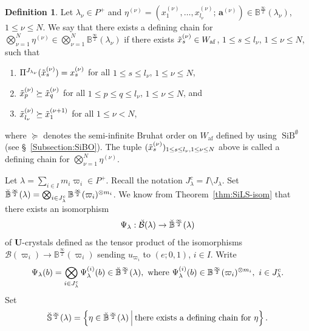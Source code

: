 \documentclass[10pt]{amsart}
\theoremstyle{definition}\newtheorem{defi}[theo]{Definition}
\theoremstyle{remark}\newtheorem{rema}[theo]{Remark}
\newcommand\bm[1]{\boldsymbol{#1}}
\newcommand{\U}{\mathbf{U}}
\newcommand{\si}{\frac{\infty}{2}}
\DeclareMathOperator{\af}{af}
\DeclareMathOperator{\SiB}{SiB}
\begin{document}
\begin{defi}
Let 
$\lambda_{\nu} \in P^+$
and 
$\eta^{(\nu)} = \left( x^{(\nu)}_1 , \ldots , x^{(\nu)}_{l_{\nu}} ;\, 
\bm{a}^{(\nu)} \right) \in \mathbb{B}^{\si}(\lambda_{\nu})$, 
$1 \leq \nu \leq N$. 
We say that there exists a defining chain for
$\bigotimes_{\nu = 1}^N \eta^{(\nu)} \in \bigotimes_{\nu = 1}^N \mathbb{B}^{\si}(\lambda_{\nu})$ 
if there exists 
$\Tilde{x}^{(\nu)}_s \in W_{\af}$, 
$1 \leq s \leq l_{\nu}$, $1 \leq \nu \leq N$, 
such that 
\begin{enumerate}[label=(DC\arabic*)]
\item
$\Pi^{J_{\lambda_{\nu}}}(\Tilde{x}^{(\nu)}_s) = x^{(\nu)}_s$ 
for all $1 \leq s \leq l_{\nu}$, $1 \leq \nu \leq N$, 
\item
$\Tilde{x}^{(\nu)}_p \succeq \Tilde{x}^{(\nu)}_q$ 
for all
$1 \leq p \leq q \leq l_{\nu}$, 
$1 \leq \nu \leq N$, 
and 
\item
$\Tilde{x}^{(\nu)}_{l_{\nu}} \succeq \Tilde{x}^{(\nu + 1)}_1$ 
for all $1 \leq \nu < N$, 
\end{enumerate}
where $\succeq$ 
denotes the semi-infinite Bruhat order 
on $W_{\af}$ defined by using 
$\SiB ^{\emptyset}$
(see \S~\ref{Subsection:SiBO}). 
The tuple
$( \Tilde{x}^{(\nu)}_s )_{1 \leq s \leq l_{\nu}, 1 \leq \nu \leq N}$
above is called a defining chain for 
$\bigotimes_{\nu = 1}^N \eta^{(\nu)}$.
\end{defi}

Let 
$\lambda = \sum_{i \in I} m_i \varpi_i \in P^+$. 
Recall the notation
$J_{\lambda}^c = I \setminus J_{\lambda}$. 
Set
$\Breve{\mathbb{B}}^{\si}(\lambda) = \bigotimes_{i \in J_{\lambda}^c} \mathbb{B}^{\si}(\varpi_i)^{\otimes m_i}$.
We know from Theorem~\ref{thm:SiLS-isom} that there exists an isomorphism 
\begin{align}
\Psi_{\lambda} : \Breve{\mathcal{B}}(\lambda) \rightarrow \Breve{\mathbb{B}}^{\si}(\lambda)
\end{align}
of $\U$-crystals 
defined as the tensor product of the isomorphisms 
$\mathcal{B}(\varpi_i) \rightarrow \mathbb{B}^{\si}(\varpi_i)$
sending 
$u_{\varpi_i}$ 
to 
$(e;0,1)$, 
$i \in I$. 
Write
\begin{align}
\Psi_{\lambda}(b) 
= 
\bigotimes_{i \in J_{\lambda}^c} \Psi^{(i)}_{\lambda}(b) \in \Breve{\mathbb{B}}^{\si}(\lambda), 
\ \text{where} \ 
\Psi^{(i)}_{\lambda}(b) \in \mathbb{B}^{\si}(\varpi_i)^{\otimes m_i}, \ 
i \in J_{\lambda}^c .
\end{align}
Set 
\begin{align}
\Breve{\mathbb{S}}^{\si}(\lambda) 
= 
\left\{ \eta \in \Breve{\mathbb{B}}^{\si}(\lambda) 
\ \vline \ 
\text{there exists a defining chain for} \ \eta \right\} .
\end{align}
\end{document}
